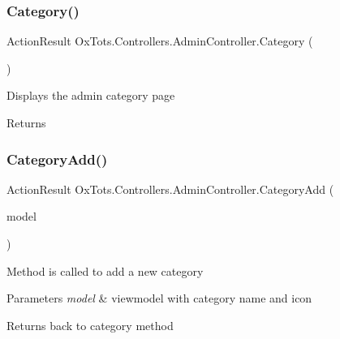 \subsubsection{\texorpdfstring{Category()}{Category()}}
{\footnotesize\ttfamily Action\+Result Ox\+Tots.\+Controllers.\+Admin\+Controller.\+Category (\begin{DoxyParamCaption}{ }\end{DoxyParamCaption})\hspace{0.3cm}{\ttfamily [inline]}}



Displays the admin category page 

\begin{DoxyReturn}{Returns}

\end{DoxyReturn}
\mbox{\label{class_ox_tots_1_1_controllers_1_1_admin_controller_a8391a76834fbfc7dcf925155044e5052}} 
\subsubsection{\texorpdfstring{CategoryAdd()}{CategoryAdd()}}
{\footnotesize\ttfamily Action\+Result Ox\+Tots.\+Controllers.\+Admin\+Controller.\+Category\+Add (\begin{DoxyParamCaption}\item[{Admin\+Category\+View\+Model}]{model }\end{DoxyParamCaption})\hspace{0.3cm}{\ttfamily [inline]}}



Method is called to add a new category 


\begin{DoxyParams}{Parameters}
{\em model} & viewmodel with category name and icon\\
\hline
\end{DoxyParams}
\begin{DoxyReturn}{Returns}
back to category method
\end{DoxyReturn}
\mbox{\label{class_ox_tots_1_1_controllers_1_1_admin_controller_a6eba9f7bd9b3e167cf0f9fbc1eff1a23}} 
